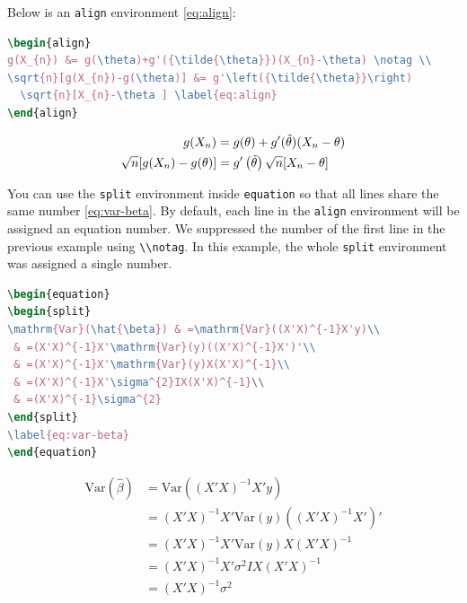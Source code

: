 \documentclass[doctor,openright,twoside]{sjtuthesis}
\newcommand{\passthrough}[1]{#1}
\theoremstyle{plain}
\theoremstyle{definition}
\theoremstyle{remark}
\theoremstyle{ocrenumbox}
\theoremstyle{plain}
\begin{document}
Below is an \passthrough{\lstinline!align!} environment \eqref{eq:align}:

\begin{lstlisting}[language=TeX]
\begin{align} 
g(X_{n}) &= g(\theta)+g'({\tilde{\theta}})(X_{n}-\theta) \notag \\
\sqrt{n}[g(X_{n})-g(\theta)] &= g'\left({\tilde{\theta}}\right)
  \sqrt{n}[X_{n}-\theta ] \label{eq:align}
\end{align} 
\end{lstlisting}

\begin{align}
g(X_{n}) &= g(\theta)+g'({\tilde{\theta}})(X_{n}-\theta) \notag \\
\sqrt{n}[g(X_{n})-g(\theta)] &= g'\left({\tilde{\theta}}\right)
  \sqrt{n}[X_{n}-\theta ] \label{eq:align}
\end{align}

You can use the \passthrough{\lstinline!split!} environment inside \passthrough{\lstinline!equation!} so that all lines share the same number \eqref{eq:var-beta}. By default, each line in the \passthrough{\lstinline!align!} environment will be assigned an equation number. We suppressed the number of the first line in the previous example using \passthrough{\lstinline!\\notag!}. In this example, the whole \passthrough{\lstinline!split!} environment was assigned a single number.

\begin{lstlisting}[language=TeX]
\begin{equation} 
\begin{split}
\mathrm{Var}(\hat{\beta}) & =\mathrm{Var}((X'X)^{-1}X'y)\\
 & =(X'X)^{-1}X'\mathrm{Var}(y)((X'X)^{-1}X')'\\
 & =(X'X)^{-1}X'\mathrm{Var}(y)X(X'X)^{-1}\\
 & =(X'X)^{-1}X'\sigma^{2}IX(X'X)^{-1}\\
 & =(X'X)^{-1}\sigma^{2}
\end{split}
\label{eq:var-beta}
\end{equation} 
\end{lstlisting}

\begin{equation}
\begin{split}
\mathrm{Var}(\hat{\beta}) & =\mathrm{Var}((X'X)^{-1}X'y)\\
 & =(X'X)^{-1}X'\mathrm{Var}(y)((X'X)^{-1}X')'\\
 & =(X'X)^{-1}X'\mathrm{Var}(y)X(X'X)^{-1}\\
 & =(X'X)^{-1}X'\sigma^{2}IX(X'X)^{-1}\\
 & =(X'X)^{-1}\sigma^{2}
\end{split}
\label{eq:var-beta}
\end{equation}
\end{document}

